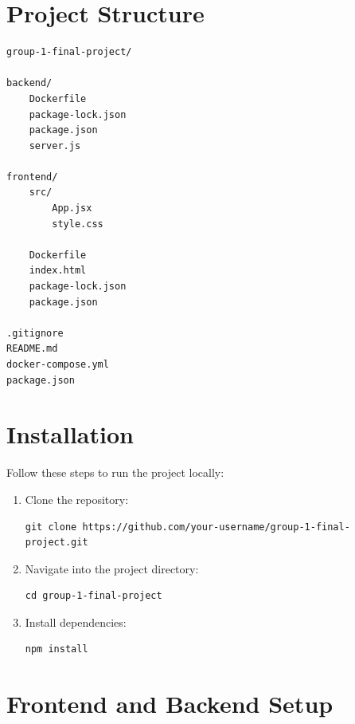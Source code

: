 \documentclass{article}
\begin{document}
\section{Project Structure}

\begin{verbatim}
group-1-final-project/

backend/
    Dockerfile
    package-lock.json
    package.json
    server.js

frontend/
    src/
        App.jsx
        style.css

    Dockerfile
    index.html
    package-lock.json
    package.json

.gitignore
README.md
docker-compose.yml
package.json
\end{verbatim}

\section{Installation}

Follow these steps to run the project locally:

\begin{enumerate}[leftmargin=*]

    \item Clone the repository:

\begin{verbatim}
git clone https://github.com/your-username/group-1-final-project.git
\end{verbatim}

    \item Navigate into the project directory:

\begin{verbatim}
cd group-1-final-project
\end{verbatim}

    \item Install dependencies:

\begin{verbatim}
npm install
\end{verbatim}

\end{enumerate}

\section{Frontend and Backend Setup}
\end{document}
